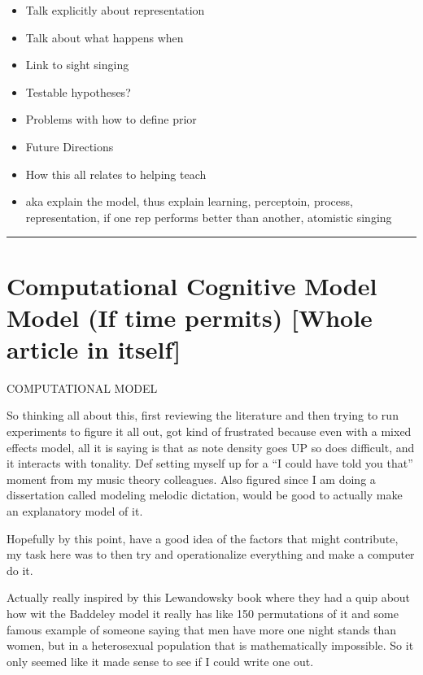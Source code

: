 \documentclass[]{book}
\providecommand{\tightlist}{%
  \setlength{\itemsep}{0pt}\setlength{\parskip}{0pt}}
\theoremstyle{definition}
\theoremstyle{definition}
\theoremstyle{definition}
\theoremstyle{remark}
\begin{document}
\begin{itemize}
\tightlist
\item
  Talk explicitly about representation
\item
  Talk about what happens when
\item
  Link to sight singing
\item
  Testable hypotheses?
\item
  Problems with how to define prior
\item
  Future Directions
\item
  How this all relates to helping teach
\item
  aka explain the model, thus explain learning, perceptoin, process,
  representation, if one rep performs better than another, atomistic
  singing
\end{itemize}

\begin{center}\rule{0.5\linewidth}{\linethickness}\end{center}

\hypertarget{computational-cognitive-model-model-if-time-permits-whole-article-in-itself}{%
\section{Computational Cognitive Model Model (If time permits) {[}Whole
article in
itself{]}}\label{computational-cognitive-model-model-if-time-permits-whole-article-in-itself}}

COMPUTATIONAL MODEL

So thinking all about this, first reviewing the literature and then
trying to run experiments to figure it all out, got kind of frustrated
because even with a mixed effects model, all it is saying is that as
note density goes UP so does difficult, and it interacts with tonality.
Def setting myself up for a ``I could have told you that'' moment from
my music theory colleagues. Also figured since I am doing a dissertation
called modeling melodic dictation, would be good to actually make an
explanatory model of it.

Hopefully by this point, have a good idea of the factors that might
contribute, my task here was to then try and operationalize everything
and make a computer do it.

Actually really inspired by this Lewandowsky book where they had a quip
about how wit the Baddeley model it really has like 150 permutations of
it and some famous example of someone saying that men have more one
night stands than women, but in a heterosexual population that is
mathematically impossible. So it only seemed like it made sense to see
if I could write one out.
\end{document}
